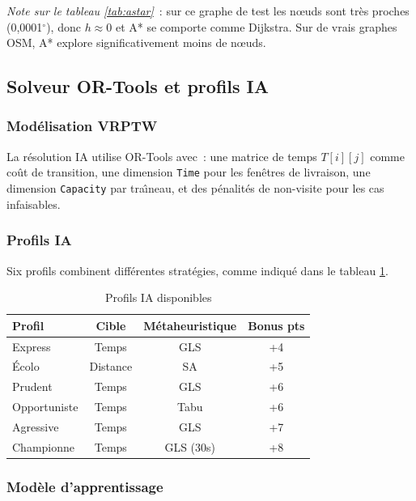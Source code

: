 \documentclass[a4paper, 12pt, twoside]{article}
\begin{document}
\textit{Note sur le tableau \ref{tab:astar}}~: sur ce graphe de test les n\oe uds sont tr\`{e}s proches (0,0001$^\circ$), donc $h \approx 0$ et A* se comporte comme Dijkstra. Sur de vrais graphes OSM, A* explore significativement moins de n\oe uds.

\subsection{Solveur OR-Tools et profils IA}

\subsubsection{Mod\'{e}lisation VRPTW}

La r\'{e}solution IA utilise OR-Tools avec~: une matrice de temps $T[i][j]$ comme co\^{u}t de transition, une dimension \texttt{Time} pour les fen\^{e}tres de livraison, une dimension \texttt{Capacity} par tra\^{\i}neau, et des p\'{e}nalit\'{e}s de non-visite pour les cas infaisables.

\subsubsection{Profils IA}

Six profils combinent diff\'{e}rentes strat\'{e}gies, comme indiqu\'{e} dans le tableau \ref{tab:profiles}.

\begin{table}[h]
\begin{center}
\begin{tabular}{|l|c|c|c|}
\hline
\textbf{Profil} & \textbf{Cible} & \textbf{M\'{e}taheuristique} & \textbf{Bonus pts} \\
\hline
Express & Temps & GLS & +4 \\
\hline
\'{E}colo & Distance & SA & +5 \\
\hline
Prudent & Temps & GLS & +6 \\
\hline
Opportuniste & Temps & Tabu & +6 \\
\hline
Agressive & Temps & GLS & +7 \\
\hline
Championne & Temps & GLS (30s) & +8 \\
\hline
\end{tabular}
\end{center}
\caption{Profils IA disponibles}
\label{tab:profiles}
\end{table}

\subsubsection{Mod\`{e}le d'apprentissage}
\end{document}
